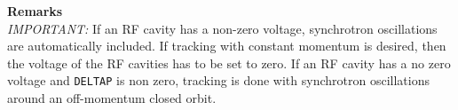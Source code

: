 \textbf{Remarks}\\
\emph{IMPORTANT:} If an RF cavity has a non-zero voltage, synchrotron
oscillations are automatically included. If tracking with constant
momentum is desired, then the voltage of the RF cavities has to be set
to zero. If an RF cavity has a no zero voltage and \texttt{DELTAP} is non zero, 
tracking is done with synchrotron oscillations around an off-momentum
closed orbit.





